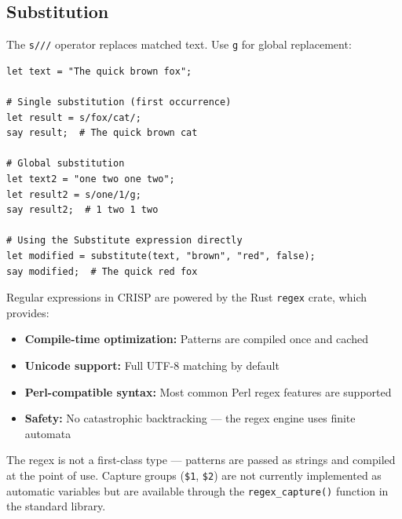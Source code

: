 \subsection{Substitution}

The \texttt{s///} operator replaces matched text. Use \texttt{g} for global replacement:

\begin{tcolorbox}[colback=codebg, colframe=darkpurple, colbacktitle=darkpurple, title=\textbf{\textcolor{codegold}{Substitution}}, fonttitle=\bfseries, sharp corners]
\begin{lstlisting}
let text = "The quick brown fox";

# Single substitution (first occurrence)
let result = s/fox/cat/;
say result;  # The quick brown cat

# Global substitution
let text2 = "one two one two";
let result2 = s/one/1/g;
say result2;  # 1 two 1 two

# Using the Substitute expression directly
let modified = substitute(text, "brown", "red", false);
say modified;  # The quick red fox
\end{lstlisting}
\end{tcolorbox}

\begin{tcolorbox}[colback=lightlavender, colframe=softvioletdark, title=\textbf{\textcolor{darkpurple}{Design Note: Regex Implementation}}, fonttitle=\bfseries, sharp corners]
Regular expressions in CRISP are powered by the Rust \texttt{regex} crate, which provides:
\begin{itemize}
    \item \textbf{Compile-time optimization:} Patterns are compiled once and cached
    \item \textbf{Unicode support:} Full UTF-8 matching by default
    \item \textbf{Perl-compatible syntax:} Most common Perl regex features are supported
    \item \textbf{Safety:} No catastrophic backtracking — the regex engine uses finite automata
\end{itemize}

The regex is not a first-class type — patterns are passed as strings and compiled at the point of use. Capture groups (\texttt{\$1}, \texttt{\$2}) are not currently implemented as automatic variables but are available through the \texttt{regex\_capture()} function in the standard library.
\end{tcolorbox}
